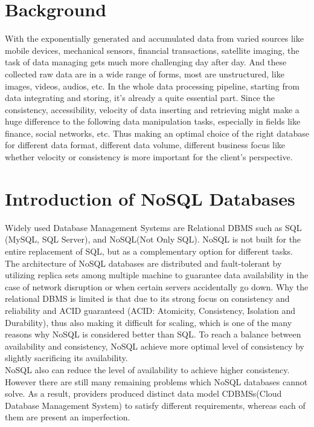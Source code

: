 \section{Background}

With the exponentially generated and accumulated data from varied
sources like mobile devices, mechanical sensors, financial transactions,
satellite imaging, the task of data managing gets much more challenging
day after day. And these collected raw data are in a wide range of
forms, most are unstructured, like images, videos, audios, etc. In the
whole data processing pipeline, starting from data integrating and
storing, it's already a quite essential part. Since the consistency,
accessibility, velocity of data inserting and retrieving might make a
huge difference to the following data manipulation tasks, especially in
fields like finance, social networks, etc. Thus making an optimal choice
of the right database for different data format, different data volume,
different business focus like whether velocity or consistency is more
important for the client's perspective.



\section{Introduction of NoSQL Databases}

Widely used Database Management Systems are Relational DBMS such as SQL
(MySQL, SQL Server), and NoSQL(Not Only SQL). NoSQL is not built for the entire replacement of SQL, but as a complementary option for different tasks. 
The architecture of NoSQL databases are distributed and fault-tolerant by utilizing replica sets among multiple machine to 
guarantee data availability in the case of network disruption or when certain servers accidentally go down.
Why the relational DBMS is
limited is that due to its strong focus on consistency and reliability
and ACID guaranteed (ACID: Atomicity, Consistency, Isolation and
Durability), thus also making it difficult for scaling, which is one of
the many reasons why NoSQL is considered better than SQL. To reach a
balance between availability and consistency, NoSQL achieve more optimal
level of consistency by slightly sacrificing its availability.\\

\noindent NoSQL also can reduce the level of availability to achieve higher
consistency. However there are still many remaining problems which NoSQL
databases cannot solve. As a result, providers produced distinct data
model CDBMSs(Cloud Database Management System) to satisfy different
requirements, whereas each of them are present an imperfection.\\

